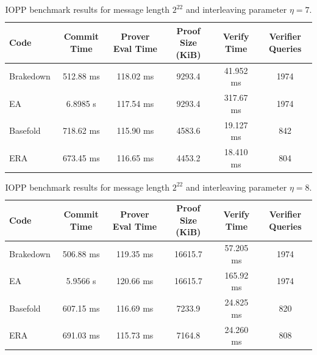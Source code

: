 \begin{table}[htbp]
\centering
\begin{tabular}{lccccc}
\hline
Code & Commit Time & Prover Eval Time & Proof Size (KiB) & Verify Time & Verifier Queries \\
\hline
Brakedown & 512.88 ms & 118.02 ms & 9293.4 & 41.952 ms & 1974 \\
EA & 6.8985 s & 117.54 ms & 9293.4 & 317.67 ms & 1974 \\
Basefold & 718.62 ms & 115.90 ms & 4583.6 & 19.127 ms & 842 \\
ERA & 673.45 ms & 116.65 ms & 4453.2 & 18.410 ms & 804 \\
\hline
\end{tabular}
\caption{IOPP benchmark results for message length $2^{22}$ and interleaving parameter $\eta=7$.}
\label{tab:iopp-222-eta7}
\end{table}

\begin{table}[htbp]
\centering
\begin{tabular}{lccccc}
\hline
Code & Commit Time & Prover Eval Time & Proof Size (KiB) & Verify Time & Verifier Queries \\
\hline
Brakedown & 506.88 ms & 119.35 ms & 16615.7 & 57.205 ms & 1974 \\
EA & 5.9566 s & 120.66 ms & 16615.7 & 165.92 ms & 1974 \\
Basefold & 607.15 ms & 116.69 ms & 7233.9 & 24.825 ms & 820 \\
ERA & 691.03 ms & 115.73 ms & 7164.8 & 24.260 ms & 808 \\
\hline
\end{tabular}
\caption{IOPP benchmark results for message length $2^{22}$ and interleaving parameter $\eta=8$.}
\label{tab:iopp-222-eta8}
\end{table}
